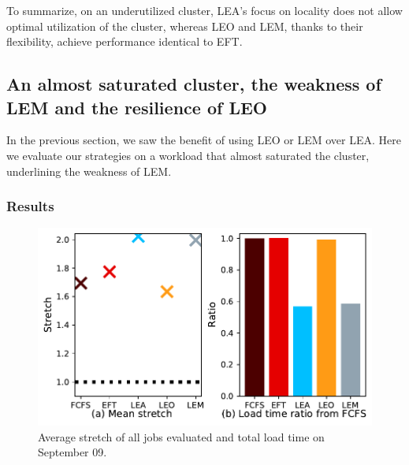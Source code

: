 \documentclass[conference,10pt]{IEEEtran}
\begin{document}
To summarize, on an underutilized cluster, LEA's focus on locality
does not allow optimal utilization of the cluster, whereas LEO and LEM, thanks
to their flexibility,
achieve performance identical to EFT.

\subsection{An almost saturated cluster, the weakness of LEM and the resilience of LEO}\label{sec.09-09}

In the previous section, we saw the benefit of using LEO or LEM over LEA.
Here we evaluate our strategies on a workload that almost saturated the
cluster, underlining the weakness of LEM.

\subsubsection{Results}

\begin{figure}[t]\centering\includegraphics[width=0.9\linewidth]{../MBSS/plot/Results_FCFS_Score_Backfill_2022-09-09->2022-09-09_V10000_Mean_Stretch_Total_waiting_for_a_load_time_and_transfer_time_450_128_32_256_4_1024.pdf}\caption{Average stretch of all jobs evaluated and total load time on September 09.}\label{stretch.09-09}\end{figure}
\end{document}

